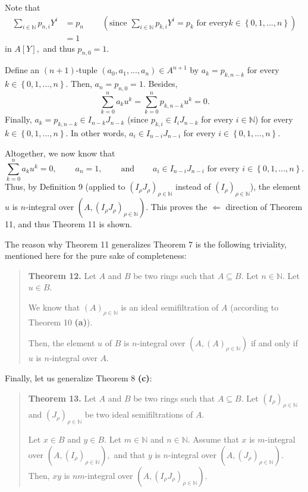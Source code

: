 \documentclass[12pt,final,notitlepage,onecolumn]{article}%
\begin{document}
Note that%
\begin{align*}
\sum\limits_{i\in\mathbb{N}}p_{n,i}Y^{i}  &  =p_{n}\ \ \ \ \ \ \ \ \ \ \left(
\text{since }\sum\limits_{i\in\mathbb{N}}p_{k,i}Y^{i}=p_{k}\text{ for every
}k\in\left\{  0,1,...,n\right\}  \right) \\
&  =1
\end{align*}
in $A\left[  Y\right]  ,$ and thus $p_{n,0}=1$.

Define an $\left(  n+1\right)  $-tuple $\left(  a_{0},a_{1},...,a_{n}\right)
\in A^{n+1}$ by $a_{k}=p_{k,n-k}$ for every $k\in\left\{  0,1,...,n\right\}
.$ Then, $a_{n}=p_{n,0}=1$. Besides,%
\[
\sum\limits_{k=0}^{n}a_{k}u^{k}=\sum\limits_{k=0}^{n}p_{k,n-k}u^{k}=0.
\]
Finally, $a_{k}=p_{k,n-k}\in I_{n-k}J_{n-k}$ (since $p_{k,i}\in I_{i}J_{n-k}$
for every $i\in\mathbb{N}$) for every $k\in\left\{  0,1,...,n\right\}  $. In
other words, $a_{i}\in I_{n-i}J_{n-i}$ for every $i\in\left\{
0,1,...,n\right\}  $.

Altogether, we now know that%
\[
\sum\limits_{k=0}^{n}a_{k}u^{k}=0,\ \ \ \ \ \ \ \ \ \ a_{n}%
=1,\ \ \ \ \ \ \ \ \ \ \text{and}\ \ \ \ \ \ \ \ \ \ a_{i}\in I_{n-i}%
J_{n-i}\text{ for every }i\in\left\{  0,1,...,n\right\}  .
\]
Thus, by Definition 9 (applied to $\left(  I_{\rho}J_{\rho}\right)  _{\rho
\in\mathbb{N}}$ instead of $\left(  I_{\rho}\right)  _{\rho\in\mathbb{N}}$),
the element $u$ is $n$-integral over $\left(  A,\left(  I_{\rho}J_{\rho
}\right)  _{\rho\in\mathbb{N}}\right)  $. This proves the $\Longleftarrow$
direction of Theorem 11, and thus Theorem 11 is shown.

The reason why Theorem 11 generalizes Theorem 7 is the following triviality,
mentioned here for the pure sake of completeness:

\begin{quote}
\textbf{Theorem 12.} Let $A$ and $B$ be two rings such that $A\subseteq B$.
Let $n\in\mathbb{N}$. Let $u\in B$.

We know that $\left(  A\right)  _{\rho\in\mathbb{N}}$ is an ideal
semifiltration of $A$ (according to Theorem 10 \textbf{(a)}).

Then, the element $u$ of $B$ is $n$-integral over $\left(  A,\left(  A\right)
_{\rho\in\mathbb{N}}\right)  $ if and only if $u$ is $n$-integral over $A$.
\end{quote}

Finally, let us generalize Theorem 8 \textbf{(c)}:

\begin{quote}
\textbf{Theorem 13.} Let $A$ and $B$ be two rings such that $A\subseteq B$.
Let $\left(  I_{\rho}\right)  _{\rho\in\mathbb{N}}$ and $\left(  J_{\rho
}\right)  _{\rho\in\mathbb{N}}$ be two ideal semifiltrations of $A$.

Let $x\in B$ and $y\in B$. Let $m\in\mathbb{N}$ and $n\in\mathbb{N}$. Assume
that $x$ is $m$-integral over $\left(  A,\left(  I_{\rho}\right)  _{\rho
\in\mathbb{N}}\right)  ,$ and that $y$ is $n$-integral over $\left(  A,\left(
J_{\rho}\right)  _{\rho\in\mathbb{N}}\right)  $. Then, $xy$ is $nm$-integral
over $\left(  A,\left(  I_{\rho}J_{\rho}\right)  _{\rho\in\mathbb{N}}\right)
$.
\end{quote}
\end{document}
